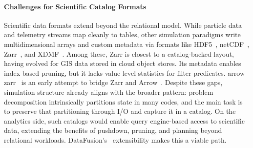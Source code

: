 \paragraph{Challenges for Scientific Catalog Formats}
Scientific data formats extend beyond the relational model.
While particle data and telemetry streams map cleanly to tables, other simulation paradigms write
multidimensional arrays and custom metadata via formats like HDF5~\cite{Folk2011:HDF5},
netCDF~\cite{:NetCDF},
Zarr~\cite{:Zarr}, and XDMF~\cite{Clark2007:XDMFE}.
Among these, Zarr is closest to a catalog-backed layout, having evolved for GIS data stored in
cloud
object stores.
Its metadata enables index-based pruning,
but it lacks value-level statistics for filter predicates.
arrow-zarr~\cite{2026:arrow-zarr} is an early attempt to bridge Zarr and Arrow~\cite{:ApacheArrow}.
Despite these gaps, simulation structure already aligns with the broader pattern: problem
decomposition
intrinsically partitions state in many codes, and the main task is to preserve that partitioning
through I/O and
capture it in a catalog.
On the analytics side, such catalogs would enable query engine-based access to scientific data,
extending the benefits of pushdown, pruning, and planning beyond relational workloads.
DataFusion's~\cite{Lamb2024:DataFusion} extensibility makes this a viable path.



